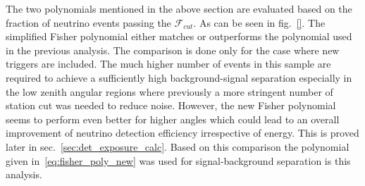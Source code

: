 The two polynomials mentioned in the above section are evaluated based on the fraction of neutrino events passing the $\mathcal{F}_{cut}$. As can be seen in fig.~\ref{}. The simplified Fisher polynomial either matches or outperforms the polynomial used in the previous analysis. The comparison is done only for the case where new triggers are included. The much higher number of events in this sample are required to achieve a sufficiently high background-signal separation especially in the low zenith angular regions where previously a more stringent number of station cut was needed to reduce noise. However, the new Fisher polynomial seems to perform even better for higher angles which could lead to an overall improvement of neutrino detection efficiency irrespective of energy. This is proved later in sec.~\ref{sec:det_exposure_calc}. Based on this comparison the polynomial given in~\ref{eq:fisher_poly_new} was used for signal-background separation is this analysis. 

